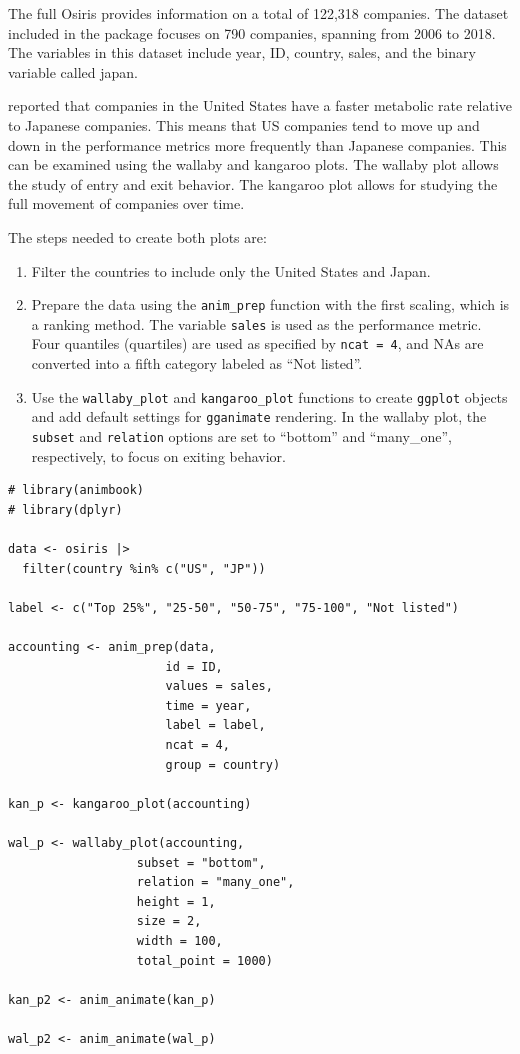 The full Osiris provides information on a total of 122,318 companies. The dataset included in the package focuses on 790 companies, spanning from 2006 to 2018. The variables in this dataset include year, ID, country, sales, and the binary variable called japan.

\citet{oecd_report} reported that companies in the United States have a faster metabolic rate relative to Japanese companies. This means that US companies tend to move up and down in the performance metrics more frequently than Japanese companies. This can be examined using the wallaby and kangaroo plots. The wallaby plot allows the study of entry and exit behavior. The kangaroo plot allows for studying the full movement of companies over time.

The steps needed to create both plots are:

\begin{enumerate}
\def\labelenumi{\arabic{enumi}.}
\tightlist
\item
  Filter the countries to include only the United States and Japan.
\item
  Prepare the data using the \texttt{anim\_prep} function with the first scaling, which is a ranking method. The variable \texttt{sales} is used as the performance metric. Four quantiles (quartiles) are used as specified by \texttt{ncat\ =\ 4}, and NAs are converted into a fifth category labeled as ``Not listed''.
\item
  Use the \texttt{wallaby\_plot} and \texttt{kangaroo\_plot} functions to create \texttt{ggplot} objects and add default settings for \texttt{gganimate} rendering. In the wallaby plot, the \texttt{subset} and \texttt{relation} options are set to ``bottom'' and ``many\_one'', respectively, to focus on exiting behavior.
\end{enumerate}

\begin{verbatim}
# library(animbook)
# library(dplyr)

data <- osiris |> 
  filter(country %in% c("US", "JP"))

label <- c("Top 25%", "25-50", "50-75", "75-100", "Not listed")

accounting <- anim_prep(data, 
                      id = ID, 
                      values = sales, 
                      time = year, 
                      label = label, 
                      ncat = 4, 
                      group = country)

kan_p <- kangaroo_plot(accounting)

wal_p <- wallaby_plot(accounting,
                  subset = "bottom",
                  relation = "many_one",
                  height = 1,
                  size = 2,
                  width = 100,
                  total_point = 1000)

kan_p2 <- anim_animate(kan_p)

wal_p2 <- anim_animate(wal_p)
\end{verbatim}


